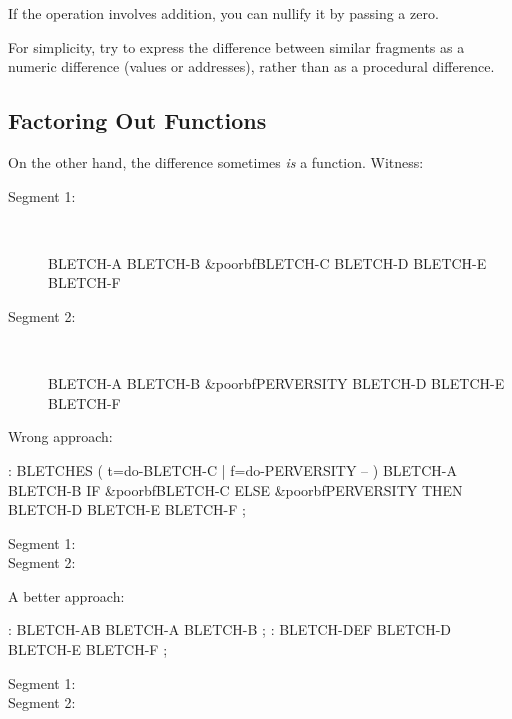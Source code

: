 If the operation involves addition, you can nullify it by passing a
zero.

\begin{tip}
For simplicity, try to express the difference between similar
fragments as a numeric difference (values or addresses), rather than
as a procedural difference.
\end{tip}

\subsection{Factoring Out Functions}
On the other hand, the difference sometimes \emph{is} a function. Witness:

\begin{description}
\item[Segment 1:]~
\begin{Code}[commandchars=\&\{\}]
BLETCH-A  BLETCH-B  &poorbf{BLETCH-C}
         BLETCH-D  BLETCH-E  BLETCH-F
\end{Code}
\item[Segment 2:]~
\begin{Code}[commandchars=\&\{\}]
BLETCH-A  BLETCH-B  &poorbf{PERVERSITY}
         BLETCH-D  BLETCH-E  BLETCH-F
\end{Code}
\end{description}

\noindent Wrong approach:

\begin{Code}[commandchars=\&\{\}]
: BLETCHES  ( t=do-BLETCH-C | f=do-PERVERSITY -- ) 
   BLETCH-A  BLETCH-B  IF &poorbf{BLETCH-C} ELSE &poorbf{PERVERSITY}
      THEN BLETCH-D BLETCH-E BLETCH-F ;
\end{Code}

\begin{description}
\item[Segment 1:] 
\item[Segment 2:] 
\end{description}

\noindent A better approach:

\begin{Code}
: BLETCH-AB   BLETCH-A BLETCH-B ;
: BLETCH-DEF   BLETCH-D BLETCH-E BLETCH-F ;
\end{Code}

\begin{description}
\item[Segment 1:] 
\item[Segment 2:] 
\end{description}

